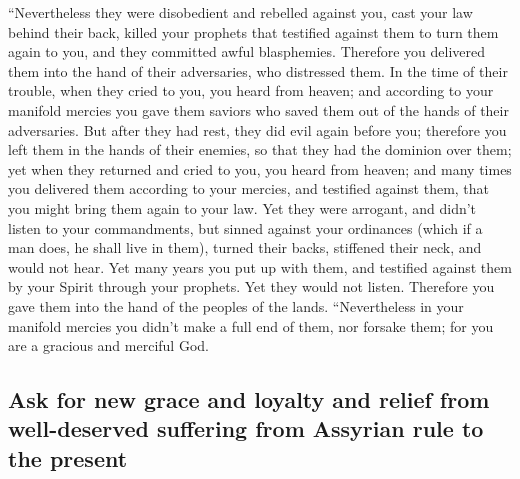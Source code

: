  ``Nevertheless they were disobedient and rebelled
against you, cast your law behind their back, killed your prophets that
testified against them to turn them again to you, and they committed
awful blasphemies.  Therefore you delivered them into the
hand of their adversaries, who distressed them. In the time of their
trouble, when they cried to you, you heard from heaven; and according to
your manifold mercies you gave them saviors who saved them out of the
hands of their adversaries.  But after they had rest,
they did evil again before you; therefore you left them in the hands of
their enemies, so that they had the dominion over them; yet when they
returned and cried to you, you heard from heaven; and many times you
delivered them according to your mercies,  and testified
against them, that you might bring them again to your law. Yet they were
arrogant, and didn't listen to your commandments, but sinned against
your ordinances (which if a man does, he shall live in them), turned
their backs, stiffened their neck, and would not hear. 
Yet many years you put up with them, and testified against them by your
Spirit through your prophets. Yet they would not listen. Therefore you
gave them into the hand of the peoples of the lands. 
``Nevertheless in your manifold mercies you didn't make a full end of
them, nor forsake them; for you are a gracious and merciful God.

\hypertarget{ask-for-new-grace-and-loyalty-and-relief-from-well-deserved-suffering-from-assyrian-rule-to-the-present}{%
\subsection{Ask for new grace and loyalty and relief from well-deserved
suffering from Assyrian rule to the
present}\label{ask-for-new-grace-and-loyalty-and-relief-from-well-deserved-suffering-from-assyrian-rule-to-the-present}}

